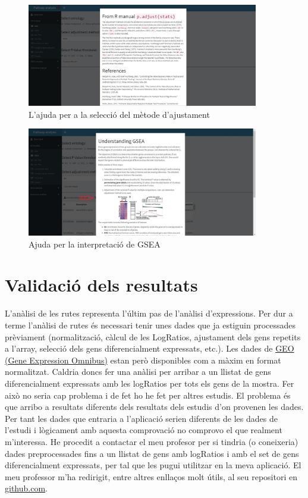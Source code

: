 \begin{figure}[H]
\centering
\includegraphics[width=0.9\textwidth]{figures/Help_pAdjustMethod.jpg} 
\caption{L'ajuda per a la selecció del mètode d'ajustament}
\end{figure}


\begin{figure}[H]
\centering
\includegraphics[width=0.9\textwidth]{figures/Help_GSEA_output.jpg} 
\caption{Ajuda per la interpretació de GSEA}
\end{figure}


\chapter{Validació dels resultats}
\label{sec:ValRes}

L’anàlisi de les rutes representa l’últim pas de l’anàlisi d’expressions. Per dur a terme l’anàlisi de rutes és necessari tenir unes dades que ja estiguin processades prèviament (normalització, càlcul de les LogRatios, ajustament dels gens repetits a l’array, selecció dels gens diferencialment expressats, etc.). Les dades de \href{https://www.ncbi.nlm.nih.gov/geo/}{GEO (Gene Expression Omnibus)} estan però disponibles com a màxim en format normalitzat. Caldria doncs fer una anàlisi per arribar a un llistat de gens diferencialment expressats amb les logRatios per tots els gens de la mostra. Fer això no seria cap problema i de fet ho he fet per altres estudis. El problema és que arribo a resultats diferents dels resultats dels estudis d’on provenen les dades. Per tant les dades que entraria a l’aplicació serien diferents de les dades de l’estudi i lògicament amb aquesta comprovació no comprovo el que realment m’interessa. He procedit a contactar el meu profesor per si tindria (o coneixeria) dades preprocessades fins a un llistat de gens amb logRatios i amb el set de gens diferencialment expressats, per tal que les pugui utilitzar en la meva aplicació. El meu professor m'ha redirigit, entre altres enllaços molt útils, al seu repositori en \href{https://github.com/alexsanchezpla?tab=repositories}{github.com}. 


